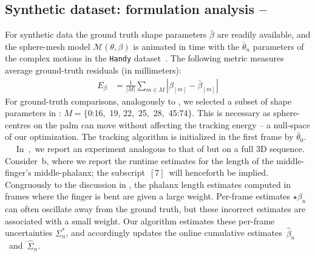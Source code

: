 \subsection{Synthetic dataset: formulation analysis -- }
\label{sec:analysis}
For synthetic data the ground truth shape parameters $\bar\beta$ are readily available, and the sphere-mesh model $\mathcal{M}(\theta,\beta)$ is animated in time with the $\bar\theta_n$ parameters of the complex motions in the \texttt{Handy} dataset~\cite{tkach2016sphere}. The following metric measures average ground-truth residuals (in millimeters):
% 
\begin{align}
E_{\beta} &= \tfrac{1}{|M|} \sum_{m \in M} \left| \beta_{[m]} - \bar\beta_{[m]} \right|
\label{eq:metricgt}
\end{align}
% 
For ground-truth comparisons, analogously to \cite{taylor2016joint}, we selected a subset of shape parameters in : $M=\{$0:16,~19, 22,~25,~28,~45:74$\}$. This is necessary as sphere-centres on the palm can move without affecting the tracking energy -- a null-space of our optimization. The tracking algorithm is initialized in the first frame by $\bar\theta_0$.
%
$\quad$
% 
In~,~we report an experiment analogous to that of  but on a full 3D sequence.
Consider~b, where we report the runtime estimates for the length of the middle-finger's middle-phalanx; the subscript~{$[7]$}~will henceforth be implied.
Congruously to the discussion in , the phalanx length
estimates computed in frames where the finger is bent are given a large weight.
Per-frame estimates {\small $\star\beta_n$} can often oscillate away from the ground truth, but these incorrect estimates are associated with a small weight.
% 
Our algorithm estimates these per-frame uncertainties {\small $\Sigma^*_n$}, and accordingly updates the online cumulative estimates~{\small $\hat\beta_n$}~and~{\small $\hat\Sigma_n$}.


